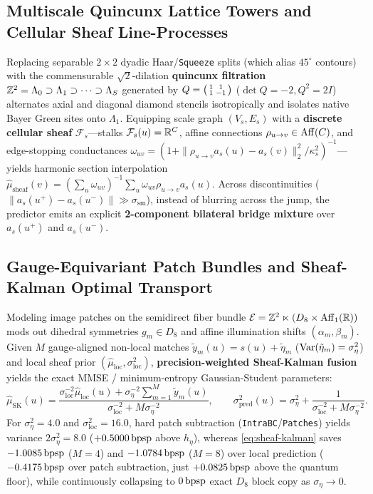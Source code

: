 \subsection{Multiscale Quincunx Lattice Towers and Cellular Sheaf Line-Processes}
Replacing separable $2\times 2$ dyadic Haar/\texttt{Squeeze} splits (which alias $45^\circ$ contours) with the commensurable $\sqrt{2}$-dilation \textbf{quincunx filtration} $\mathbb{Z}^2 = \Lambda_0 \supset \Lambda_1 \supset \dots \supset \Lambda_S$ generated by $Q = \begin{psmallmatrix}1 & 1\\1 & -1\end{psmallmatrix}$ ($\det Q = -2, Q^2 = 2I$) alternates axial and diagonal diamond stencils isotropically and isolates native Bayer Green sites onto $\Lambda_1$. Equipping scale graph $(V_s, E_s)$ with a \textbf{discrete cellular sheaf} $\mathcal{F}_s$---stalks $\mathcal{F}_s(u)=\mathbb{R}^C$, affine connections $\rho_{u\to v} \in \mathrm{Aff}(C)$, and edge-stopping conductances $\omega_{uv} = (1 + \|\rho_{u\to v} a_s(u) - a_s(v)\|_2^2/\kappa_s^2)^{-1}$---yields harmonic section interpolation $\hat{\mu}_{\mathrm{sheaf}}(v) = (\sum_u \omega_{uv})^{-1}\sum_u \omega_{uv}\rho_{u\to v}a_s(u)$. Across discontinuities ($\|a_s(u^+) - a_s(u^-)\| \gg \sigma_{\mathrm{sm}}$), instead of blurring across the jump, the predictor emits an explicit \textbf{2-component bilateral bridge mixture} over $a_s(u^+)$ and $a_s(u^-)$.

\subsection{Gauge-Equivariant Patch Bundles and Sheaf-Kalman Optimal Transport}
Modeling image patches on the semidirect fiber bundle $\mathcal{E} = \mathbb{Z}^2 \ltimes (D_8 \times \mathrm{Aff}_1(\mathbb{R}))$ mods out dihedral symmetries $g_m \in D_8$ and affine illumination shifts $(\alpha_m,\beta_m)$. Given $M$ gauge-aligned non-local matches $\tilde{y}_m(u) = s(u) + \tilde{\eta}_m$ ($\operatorname{Var}(\tilde{\eta}_m) = \sigma_\eta^2$) and local sheaf prior $(\hat{\mu}_{\mathrm{loc}}, \sigma_{\mathrm{loc}}^2)$, \textbf{precision-weighted Sheaf-Kalman fusion} yields the exact MMSE / minimum-entropy Gaussian-Student parameters:
\begin{equation}
  \hat{\mu}_{\mathrm{SK}}(u) = \frac{\sigma_{\mathrm{loc}}^{-2}\hat{\mu}_{\mathrm{loc}}(u) + \sigma_\eta^{-2}\sum_{m=1}^M \tilde{y}_m(u)}{\sigma_{\mathrm{loc}}^{-2} + M\sigma_\eta^{-2}}, \qquad
  \sigma_{\mathrm{pred}}^2(u) = \sigma_\eta^2 + \frac{1}{\sigma_{\mathrm{loc}}^{-2} + M\sigma_\eta^{-2}}.
  \label{eq:sheaf-kalman}
\end{equation}
For $\sigma_\eta^2 = 4.0$ and $\sigma_{\mathrm{loc}}^2 = 16.0$, hard patch subtraction (\texttt{IntraBC}/\texttt{Patches}) yields variance $2\sigma_\eta^2 = 8.0$ ($+0.5000\,\mathrm{bpsp}$ above $h_\eta$), whereas \eqref{eq:sheaf-kalman} saves \textbf{$-1.0085\,\mathrm{bpsp}$} ($M=4$) and \textbf{$-1.0784\,\mathrm{bpsp}$} ($M=8$) over local prediction (\textbf{$-0.4175\,\mathrm{bpsp}$} over patch subtraction, just $+0.0825\,\mathrm{bpsp}$ above the quantum floor), while continuously collapsing to $0\,\mathrm{bpsp}$ exact $D_8$ block copy as $\sigma_\eta \to 0$.

